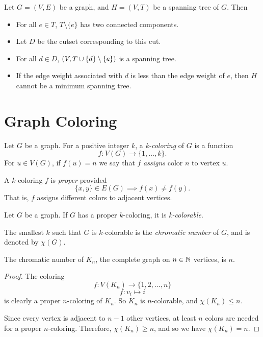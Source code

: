 \begin{prop}
    Let $G = (V, E)$ be a graph, and $H = (V, T)$ be a spanning tree of $G$. Then
    \begin{itemize}
        \item For all $e \in T$, $T \setminus \{e\}$ has two connected components.
        \item Let $D$ be the cutset corresponding to this cut.
        \item For all $d \in D$, $(V, T \cup \{d\} \setminus \{e\})$ is a spanning tree.
        \item If the edge weight associated with $d$ is less than the edge weight of $e$, then $H$ cannot be a minimum spanning tree.
    \end{itemize}
\end{prop}

\section{Graph Coloring}

\begin{defn}
    Let $G$ be a graph. For a positive integer $k$, a \emph{k-coloring} of $G$ is a function
    \[f: V(G) \to \{1, \ldots, k\}.\] For $u \in V(G)$, if $f(u) = n$ we say that $f$ \emph{assigns} color $n$ to vertex $u$.
\end{defn}

\begin{defn}
    A $k$-coloring $f$ is \emph{proper} provided
    \[\{x, y\} \in E(G) \implies f(x) \neq f(y).\]
    That is, $f$ assigns different colors to adjacent vertices.
\end{defn}

\begin{defn}
    Let $G$ be a graph. If $G$ has a proper $k$-coloring, it is \emph{k-colorable}.
\end{defn}

\begin{defn}
    The smallest $k$ such that $G$ is $k$-colorable is the \emph{chromatic number} of $G$, and is denoted by $\chi(G)$.
\end{defn}

\begin{prop}
    The chromatic number of $K_n$, the complete graph on $n \in \mathbb{N}$ vertices, is $n$.
\end{prop}

\begin{proof}
    The coloring
    \[f: V(K_n) \to \{1, 2, \ldots, n\}\]
    \[f: v_i \mapsto i\]
    is clearly a proper $n$-coloring of $K_n$. So $K_n$ is $n$-colorable, and $\chi(K_n) \leq n$.

    Since every vertex is adjacent to $n-1$ other vertices, at least $n$ colors are needed for a proper $n$-coloring. Therefore, $\chi(K_n) \geq n$, and so we have $\chi(K_n) = n$.
\end{proof}

